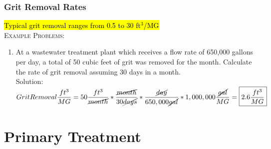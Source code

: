 \subsection{Grit Removal Rates}
\hl{Typical grit removal ranges from 0.5 to 30 ft$^3$/MG}\\
\vspace{0.3cm}
\noindent\textsc{Example Problems:}\\
\begin{enumerate}[1.]
\item At a wastewater treatment plant which receives a flow rate of 650,000 gallons per day, a total of 50 cubic feet of grit was removed for the month. Calculate the rate of grit removal assuming 30 days in a month.\\
Solution:\\
$Grit Removal\dfrac{ft^3}{MG}=50\dfrac{ft^3}{ \cancel{month}}*\dfrac{\cancel{month}}{30\cancel{days}}*\dfrac{\cancel{day}}{650,000\cancel{gal}}*1,000,000\dfrac{\cancel{gal}}{MG}=\boxed{2.6\dfrac{ft^3}{MG}}$
\end{enumerate}

\chapter{Primary Treatment}

